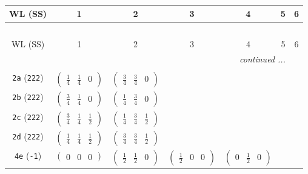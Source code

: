 \documentclass[fleqn,9pt,landscape]{jsarticle}
\begin{document}
\begin{center}
\renewcommand{\arraystretch}{1.2}
\begin{longtable}{ccccccc}
 \hline \hline
WL (SS) & 1 & 2 & 3 & 4 & 5 & 6 \\ \hline \endfirsthead

\multicolumn{6}{l}{\tablename\ \thetable{}} \\
 \hline \hline
WL (SS) & 1 & 2 & 3 & 4 & 5 & 6 \\ \hline \endhead

 \hline \hline
\multicolumn{6}{r}{\footnotesize\it continued ...} \\ \endfoot

 \hline \hline
\multicolumn{6}{r}{} \\ \endlastfoot

{\tt 2a} ({\tt 222}) & $ \begin{pmatrix} \frac{1}{4} & \frac{1}{4} & 0 \end{pmatrix} $ & $ \begin{pmatrix} \frac{3}{4} & \frac{3}{4} & 0 \end{pmatrix} $ & $  $ & $  $ & $  $ & $  $ \\ \hline
{\tt 2b} ({\tt 222}) & $ \begin{pmatrix} \frac{3}{4} & \frac{1}{4} & 0 \end{pmatrix} $ & $ \begin{pmatrix} \frac{1}{4} & \frac{3}{4} & 0 \end{pmatrix} $ & $  $ & $  $ & $  $ & $  $ \\ \hline
{\tt 2c} ({\tt 222}) & $ \begin{pmatrix} \frac{3}{4} & \frac{1}{4} & \frac{1}{2} \end{pmatrix} $ & $ \begin{pmatrix} \frac{1}{4} & \frac{3}{4} & \frac{1}{2} \end{pmatrix} $ & $  $ & $  $ & $  $ & $  $ \\ \hline
{\tt 2d} ({\tt 222}) & $ \begin{pmatrix} \frac{1}{4} & \frac{1}{4} & \frac{1}{2} \end{pmatrix} $ & $ \begin{pmatrix} \frac{3}{4} & \frac{3}{4} & \frac{1}{2} \end{pmatrix} $ & $  $ & $  $ & $  $ & $  $ \\ \hline
{\tt 4e} ({\tt -1}) & $ \begin{pmatrix} 0 & 0 & 0 \end{pmatrix} $ & $ \begin{pmatrix} \frac{1}{2} & \frac{1}{2} & 0 \end{pmatrix} $ & $ \begin{pmatrix} \frac{1}{2} & 0 & 0 \end{pmatrix} $ & $ \begin{pmatrix} 0 & \frac{1}{2} & 0 \end{pmatrix} $ & $  $ & $  $ \\ \hline

\end{longtable}
\end{center}
\end{document}
